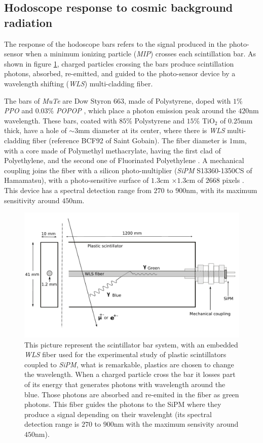 \documentclass[submitting]{nst}
\begin{document}
\subsection{Hodoscope response to cosmic background radiation}\label{sec:hodoscope-response}
The response of the hodoscope bars refers to the signal produced in the photo-sensor when a minimum ionizing particle (\textsl{MIP}) crosses each scintillation bar. As shown in figure \ref{esquema_centelladora}, charged particles crossing the bars produce scintillation photons, absorbed, re-emitted, and guided to the photo-sensor device by a wavelength shifting (\textsl{WLS}) multi-cladding fiber. 

The bars of \textsl{MuTe} are Dow Styron $663$, made of Polystyrene, doped with $1$\% \textsl{PPO} and $0.03$\% \textsl{POPOP} \cite{PlaBrossRykalin2003}, which place a photon emission peak around the $420$nm wavelength. These bars, coated with $85$\% Polystyrene and $15$\% TiO$_2$ of $0.25$mm thick, have a hole of $\sim 3$mm diameter at its center,  where there is \textsl{WLS} multi-cladding fiber (reference BCF92 of Saint Gobain). The fiber diameter is $1$mm, with a core made of Polymethyl methacrylate, having the first clad of Polyethylene, and the second one of Fluorinated Polyethylene \cite{SaintGobain2017}. A mechanical coupling joins the fiber with a silicon photo-multiplier (\textsl{SiPM} S13360-1350CS of Hamamatsu), with a photo-sensitive surface of $1.3$cm $\times 1.3$cm of $2668$ pixels \cite{Hamamatsu2018}. This device has a spectral detection range from $270$ to $900$nm, with its maximum sensitivity around $450$nm.

\begin{figure}[h!] %
    \centering
        \includegraphics[scale=0.21]{Figures/esquema_barra.jpeg}
   \caption{This picture represent the scintillator bar system, with an embedded \textsl{WLS} fiber used for the experimental study of plastic scintillators coupled to \textsl{SiPM}, what is remarkable, plastics are chosen to change the wavelength. When a charged particle cross the bar it losses part of its energy that generates photons with wavelength around the blue. Those photons are absorbed and re-emited in the fiber as green photons. This fiber guides the photons to the SiPM where they produce a signal depending on their wavelenght (its spectral detection range is $270$ to $900$nm with the maximum sensivity around $450$nm).}\label{esquema_centelladora}
\end{figure}
\end{document}
